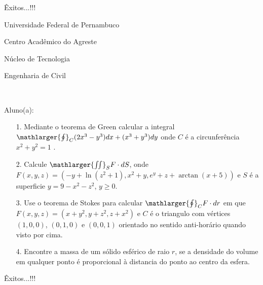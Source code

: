 \documentclass[oneside,a4paper,12pt]{article}
\newcommand{\universidade}{Universidade Federal de Pernambuco}
\newcommand{\centro}{Centro Acadêmico do Agreste}
\newcommand{\departamento}{Núcleo de Tecnologia}
\newcommand{\curso}{Engenharia de Civil}
\begin{document}
	\flushbottom
	\flushright
     Êxitos...!!!
     \begin{center}
     	\vspace{0pt}
     	
     	\universidade
     	\par
     	\centro
     	\par
     	\departamento
     	\par
     	\curso
     	\par
     	\vspace{08pt}
     	\\
     \end{center}
     
     \begin{flushleft}
     	Aluno(a):
     \end{flushleft}
 
 \begin{itemize}
 	\item[1.] Mediante o teorema de Green calcular a integral $\mathlarger{\oint}_{C} (2x^{3}-y^{3})dx+(x^{3}+y^{3})dy$ onde $C$ é a circunferência $x^{2}+y^{2}=1$ .
 \end{itemize}
 \begin{itemize}
 	\item[2.] Calcule $\mathlarger{\iint}_{S}F\cdot dS$, onde $F(x,y,z)=\left(-y+\ln(z^{2}+1), x^{2}+y, e^{y}+z+\arctan(x+5) \right) $ e $S$ é a superficie $y=9-x^{2}-z^{2}$, $y\geq 0$. 
 \end{itemize}
 \begin{itemize}
 	\item [3.] Use o teorema de Stokes para calcular $\mathlarger{\oint}_{C} {F}\cdot dr$ em que\\ 
 	$F(x,y,z)=(x+y^{2},y+z^{2},z+x^{2})$ e $C$ é o triangulo com vértices $(1,0,0)$, $(0,1,0)$ e $(0,0,1)$ orientado no sentido anti-horário quando visto por cima.
 \end{itemize}
 \begin{itemize}
 	\item[4.] Encontre a massa de um sólido esférico de raio $r$, se a densidade do volume em qualquer ponto é proporcional à distancia do ponto ao centro da esfera.
 \end{itemize}
\flushbottom
\flushright
Êxitos...!!!
\end{document}
